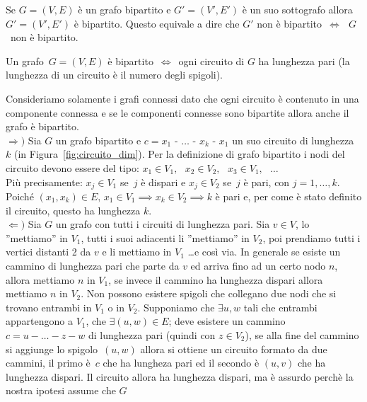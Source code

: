 \begin{prop}
Se $G=(V,E)$ è un grafo bipartito e $G'=(V',E')$ è un suo sottografo allora
$G'=(V',E')$ è bipartito.
Questo equivale a dire che $G'$ non è bipartito~$\iff \text{ } G$~non è bipartito. 
\end{prop}

\begin{thm}
Un grafo~$G=(V,E)$ è bipartito~$\iff$~ogni circuito di $G$ ha lunghezza pari
(la lunghezza di un circuito è il numero degli spigoli).
\end{thm}
\proof
Consideriamo solamente i grafi connessi dato che ogni circuito è contenuto in una componente
connessa e se le componenti connesse sono bipartite allora anche il grafo è bipartito.\\
$\Longrightarrow)$ Sia $G$ un grafo bipartito e ${c = x_1\text{ - }\dots\text{ - }x_k\text{ - }x_1}$
un suo circuito di lunghezza $k$ (in Figura~\ref{fig:circuito_dim}).
Per la definizione di grafo bipartito i nodi del circuito devono essere del tipo:
${x_1 \in V_1,}\text{ }{x_2 \in V_2,}\text{ }{x_3 \in V_1,\text{ }\dots}$\\ 
Più precisamente: ${x_j \in V_1}$ se~$j$ è dispari e ${x_j \in V_2}$ se~$j$ è pari, con
${j = 1,\dots,k}$.\\
Poiché ${(x_1, x_k) \in E} \text{, } {x_1 \in V_1 \implies x_k \in V_2 \implies k}$ è pari
e, per come è stato definito il circuito, questo ha lunghezza $k$.\\
$\Longleftarrow)$ Sia $G$ un grafo con tutti i circuiti di lunghezza pari. Sia $v \in V$,
lo ''mettiamo'' in $V_1$, tutti i suoi adiacenti li ''mettiamo'' in $V_2$, poi prendiamo
tutti i vertici distanti 2 da $v$ e li mettiamo in $V_1$ \dots e così via.
In generale se esiste un cammino di lunghezza pari che parte da $v$ ed arriva fino ad un certo
nodo $n$, allora mettiamo $n$ in $V_1$, se invece il cammino ha lunghezza dispari allora
mettiamo $n$ in $V_2$.
Non possono esistere spigoli che collegano due nodi che si trovano entrambi in $V_1$ o in $V_2$.
Supponiamo che $\exists u,w$ tali che entrambi appartengono a $V_1$, che ${\exists (u,w) \in E}$;
deve esistere un cammino ${c = u - \dots - z - w}$ di lunghezza pari (quindi con ${z \in V_2}$),
se alla fine del cammino si aggiunge lo spigolo~$(u,w)$ allora si ottiene un circuito formato da
due cammini, il primo è~$c$ che ha lungheza pari ed il secondo è $(u,v)$ che ha lunghezza dispari.
Il circuito allora ha lunghezza dispari, ma è assurdo perchè la nostra ipotesi assume che $G$ 
